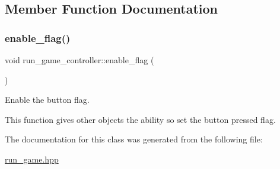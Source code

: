 \subsection{Member Function Documentation}
\hypertarget{classrun__game__controller_a45846159930efd40f9b20ecf72e36003}{}\label{classrun__game__controller_a45846159930efd40f9b20ecf72e36003} 
\subsubsection{\texorpdfstring{enable\+\_\+flag()}{enable\_flag()}}
{\footnotesize\ttfamily void run\+\_\+game\+\_\+controller\+::enable\+\_\+flag (\begin{DoxyParamCaption}{ }\end{DoxyParamCaption})\hspace{0.3cm}{\ttfamily [inline]}}



Enable the button flag. 

This function gives other objects the ability so set the button pressed flag. 

The documentation for this class was generated from the following file\+:\begin{DoxyCompactItemize}
\item 
\hyperlink{run__game_8hpp}{run\+\_\+game.\+hpp}\end{DoxyCompactItemize}
